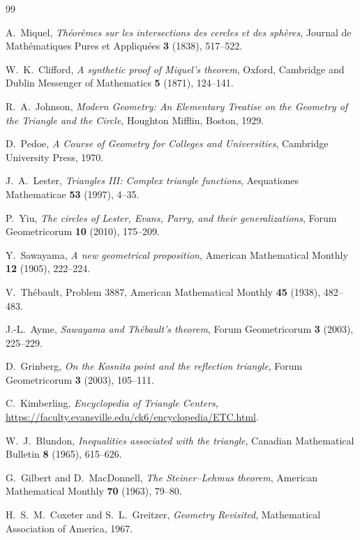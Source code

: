 \begin{thebibliography}{99}

A.~Miquel,
\emph{Th\'eor\`emes sur les intersections des cercles et des sph\`eres},
Journal de Math\'ematiques Pures et Appliqu\'ees \textbf{3} (1838), 517--522.

W.~K.~Clifford,
\emph{A synthetic proof of Miquel's theorem},
Oxford, Cambridge and Dublin Messenger of Mathematics \textbf{5} (1871), 124--141.

R.~A.~Johnson,
\emph{Modern Geometry: An Elementary Treatise on the Geometry of the Triangle and the Circle},
Houghton Mifflin, Boston, 1929.

D.~Pedoe,
\emph{A Course of Geometry for Colleges and Universities},
Cambridge University Press, 1970.

J.~A.~Lester,
\emph{Triangles III: Complex triangle functions},
Aequationes Mathematicae \textbf{53} (1997), 4--35.

P.~Yiu,
\emph{The circles of Lester, Evans, Parry, and their generalizations},
Forum Geometricorum \textbf{10} (2010), 175--209.

Y.~Sawayama,
\emph{A new geometrical proposition},
American Mathematical Monthly \textbf{12} (1905), 222--224.

V.~Th\'ebault,
Problem 3887,
American Mathematical Monthly \textbf{45} (1938), 482--483.

J.-L.~Ayme,
\emph{Sawayama and Th\'ebault's theorem},
Forum Geometricorum \textbf{3} (2003), 225--229.

D.~Grinberg,
\emph{On the Kosnita point and the reflection triangle},
Forum Geometricorum \textbf{3} (2003), 105--111.

C.~Kimberling,
\emph{Encyclopedia of Triangle Centers},
\url{https://faculty.evansville.edu/ck6/encyclopedia/ETC.html}.

W.~J.~Blundon,
\emph{Inequalities associated with the triangle},
Canadian Mathematical Bulletin \textbf{8} (1965), 615--626.

G.~Gilbert and D.~MacDonnell,
\emph{The Steiner--Lehmus theorem},
American Mathematical Monthly \textbf{70} (1963), 79--80.

H.~S.~M.~Coxeter and S.~L.~Greitzer,
\emph{Geometry Revisited},
Mathematical Association of America, 1967.


\end{thebibliography}

